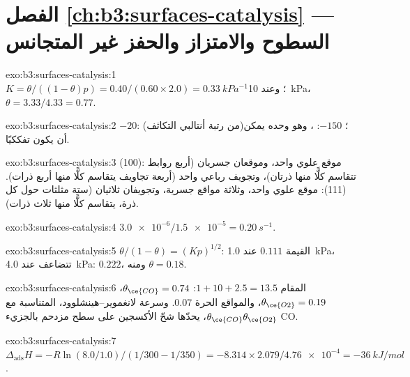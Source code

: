 \section*{الفصل \ref{ch:b3:surfaces-catalysis} --- السطوح والامتزاز والحفز غير المتجانس}

\begin{solution}{exo:b3:surfaces-catalysis:1}
$K = \theta/((1 - \theta)p) = 0.40/(0.60 \times 2.0) = \qty{0.33}{kPa^{-1}}$؛ وعند \qty{10}{kPa}، $\theta = 3.33/4.33 = 0.77$.
\end{solution}

\begin{solution}{exo:b3:surfaces-catalysis:2}
$-20$:  (من رتبة أنتالبي التكاثف)؛ $-150$: ، وهو
وحده يمكن أن يكون تفككيًا.
\end{solution}

\begin{solution}{exo:b3:surfaces-catalysis:3}
(100): موقع علوي واحد، وموقعان جسريان (أربع روابط تتقاسم كلًّا منها ذرتان)، وتجويف رباعي
واحد (أربعة تجاويف يتقاسم كلًّا منها أربع ذرات). (111): موقع علوي واحد، وثلاثة مواقع جسرية، وتجويفان
ثلاثيان (ستة مثلثات حول كل ذرة، يتقاسم كلًّا منها ثلاث ذرات).
\end{solution}

\begin{solution}{exo:b3:surfaces-catalysis:4}
$\num{3.0e-6}/\num{1.5e-5} = \qty{0.20}{s^{-1}}$.
\end{solution}

\begin{solution}{exo:b3:surfaces-catalysis:5}
$\theta/(1 - \theta) = (Kp)^{1/2}$: القيمة $0.111$ عند \qty{1.0}{kPa}، تتضاعف عند \qty{4.0}{kPa}: $0.222$، ومنه $\theta = 0.18$.
\end{solution}

\begin{solution}{exo:b3:surfaces-catalysis:6}
المقام $1 + 10 + 2.5 = 13.5$: $\theta_{\ce{CO}} = 0.74$، $\theta_{\ce{O2}} = 0.19$، والمواقع الحرة 0.07. 
وسرعة لانغموير--هينشلوود، المتناسبة مع $\theta_{\ce{CO}}\theta_{\ce{O2}}$، يحدّها
شحّ الأكسجين على سطح مزدحم بالجزيء CO.
\end{solution}

\begin{solution}{exo:b3:surfaces-catalysis:7}
$\Delta_{\mathrm{ads}}H = -R\ln(8.0/1.0)/(1/300 - 1/350) = -8.314 \times 2.079/\num{4.76e-4} = \qty{-36}{kJ/mol}$.
\end{solution}

